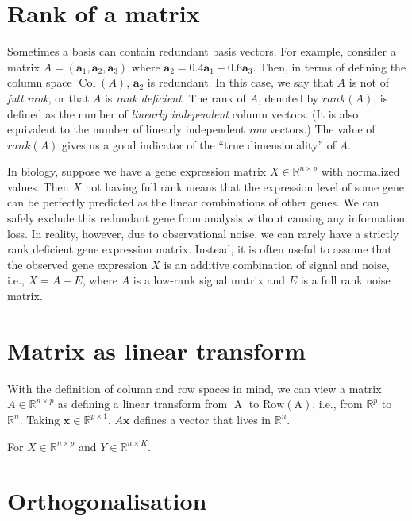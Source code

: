 \documentclass[
]{book}
\begin{document}
\section{Rank of a matrix}\label{rank-of-a-matrix}

Sometimes a basis can contain redundant basis vectors. For example, consider a matrix \(A = (\mathbf{a}_1, \mathbf{a}_2, \mathbf{a}_3)\) where \(\mathbf{a}_2 = 0.4\mathbf{a}_1 + 0.6\mathbf{a}_3\). Then, in terms of defining the column space \(\operatorname{Col}(A)\), \(\mathbf{a}_2\) is redundant. In this case, we say that \(A\) is not of \emph{full rank}, or that \(A\) is \emph{rank deficient}. The rank of \(A\), denoted by \(rank(A)\), is defined as the number of \emph{linearly independent} column vectors. (It is also equivalent to the number of linearly independent \emph{row} vectors.) The value of \(rank(A)\) gives us a good indicator of the ``true dimensionality'' of \(A\).

In biology, suppose we have a gene expression matrix \(X \in \mathbb{R}^{n \times p}\) with normalized values. Then \(X\) not having full rank means that the expression level of some gene can be perfectly predicted as the linear combinations of other genes. We can safely exclude this redundant gene from analysis without causing any information loss. In reality, however, due to observational noise, we can rarely have a strictly rank deficient gene expression matrix. Instead, it is often useful to assume that the observed gene expression \(X\) is an additive combination of signal and noise, i.e., \(X = A + E\), where \(A\) is a low-rank signal matrix and \(E\) is a full rank noise matrix.

\section{Matrix as linear transform}\label{matrix-as-linear-transform}

With the definition of column and row spaces in mind, we can view a matrix \(A \in \mathbb{R}^{n \times p}\) as defining a linear transform from \(\operatorname{A}\) to \(\operatorname{Row(A)}\), i.e., from \(\mathbb{R}^{p}\) to \(\mathbb{R}^n\). Taking \(\mathbf x \in \mathbb{R}^{p \times 1}\), \(A\mathbf x\) defines a vector that lives in \(\mathbb{R}^n\).

For \(X \in \mathbb{R}^{n \times p}\) and \(Y \in \mathbb{R}^{n \times K}\).

\section{Orthogonalisation}\label{orthogonalisation}
\end{document}
